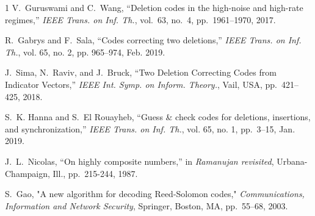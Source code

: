 \documentclass[10pt,a4paper,onecolumn]{IEEEtran}
\newcommand{\1}{\mathbbold{1}}
\begin{document}
\begin{thebibliography}{1}
V.~Guruswami and C.~Wang, ``Deletion codes in the high-noise and high-rate regimes,'' \emph{IEEE Trans. on Inf. Th.}, vol.~63, no.~4, pp.~1961--1970, 2017.

R.~Gabrys and F.~Sala, ``Codes correcting two deletions,'' \emph{IEEE Trans. on Inf. Th.}, vol. 65, no. 2, pp. 965--974, Feb. 2019.

J.~Sima, N.~Raviv, and J.~Bruck, ``Two Deletion Correcting Codes from Indicator Vectors,'' \emph{IEEE Int. Symp. on Inform. Theory.}, Vail, USA, pp.~421--425, 2018.




S.~K. Hanna and S.~El Rouayheb, ``Guess \& check codes for deletions, insertions, and synchronization,'' \emph{IEEE Trans. on Inf. Th.}, vol. 65, no. 1, pp.~3--15, Jan. 2019.



J.~L.~Nicolas, ``On highly composite numbers,'' in \emph{Ramanujan revisited}, Urbana-Champaign, Ill., pp.~215-244, 1987.

S.~Gao, "A new algorithm for decoding Reed-Solomon codes," \emph{Communications, Information and Network Security}, Springer, Boston, MA,  pp.~55--68, 2003.
\end{thebibliography}
\end{document}
